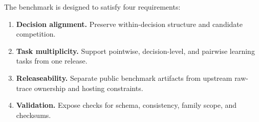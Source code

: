 The benchmark is designed to satisfy four requirements:
\begin{enumerate}[leftmargin=*]
  \item \textbf{Decision alignment.} Preserve within-decision structure and candidate competition.
  \item \textbf{Task multiplicity.} Support pointwise, decision-level, and pairwise learning tasks from one release.
  \item \textbf{Releaseability.} Separate public benchmark artifacts from upstream raw-trace ownership and hosting constraints.
  \item \textbf{Validation.} Expose checks for schema, consistency, family scope, and checksums.
\end{enumerate}




